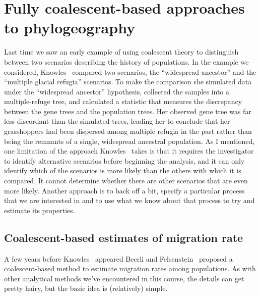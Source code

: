 \chapter{Fully coalescent-based approaches to phylogeography}

Last time we saw an early example of using coalescent theory to
distinguish between two scenarios describing the history of
populations. In the example we considered, Knowles~\cite{Knowles-2001}
compared two scenarios, the ``widespread ancestor'' and the ``multiple
glacial refugia'' scenarios. To make the comparison she simulated data
under the ``widespread ancestor'' hypothesis, collected the samples
into a multiple-refuge tree, and calculated a statistic that measures
the discrepancy between the gene trees and the population trees. Her
observed gene tree was far less discordant than the simulated trees,
leading her to conclude that her grasshoppers had been dispersed among
multiple refugia in the past rather than being the remnants of a
single, widespread ancestral population. As I mentioned, one
limitation of the approach Knowles~\cite{Knowles-2001} takes is that
it requires the investigator to identify alternative scenarios before
beginning the analysis, and it can only identify which of the
scenarios is more likely than the others with which it is compared. It
cannot determine whether there are other scenarios that are even more
likely. Another approach is to back off a bit, specify a particular
process that we are interested in and to use what we know about that
process to try and estimate its properties.

\section*{Coalescent-based estimates of migration rate}

A few years before Knowles~\cite{Knowles-2001} appeared Beerli and
Felsenstein~\cite{Beerli-Felsenstein-1999,Beerli-Felsenstein-2001}
proposed a coalescent-based method to estimate migration rates among
populations. As with other analytical methods we've encountered in
this course, the details can get pretty hairy, but the basic idea is
(relatively) simple.

